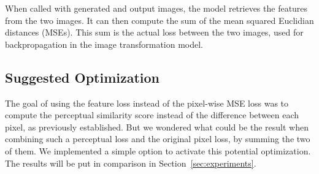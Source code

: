 \documentclass{article}
\begin{document}
{    \bigskip

    When called with generated and output images, the model retrieves the features from the two images. It can then compute the sum of the mean squared Euclidian distances (MSEs). This sum is the actual loss between the two images, used for backpropagation in the image transformation model.

    \subsection{Suggested Optimization}
    \label{subsec:suggested-optimization}

    The goal of using the feature loss instead of the pixel-wise MSE loss was to compute the perceptual similarity score instead of the difference between each pixel, as previously established. But we wondered what could be the result when combining such a perceptual loss and the original pixel loss, by summing the two of them. We implemented a simple option to activate this potential optimization. The results will be put in comparison in Section~\ref{sec:experiments}.
}
\end{document}
